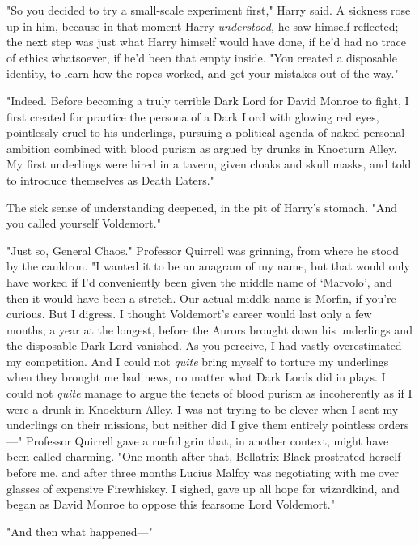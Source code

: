 "So you decided to try a small-scale experiment first," Harry said. A sickness
rose up in him, because in that moment Harry \emph{understood,} he saw himself
reflected; the next step was just what Harry himself would have done, if he'd
had no trace of ethics whatsoever, if he'd been that empty inside. "You created
a disposable identity, to learn how the ropes worked, and get your mistakes out
of the way."

"Indeed. Before becoming a truly terrible Dark Lord for David Monroe to fight,
I first created for practice the persona of a Dark Lord with glowing red eyes,
pointlessly cruel to his underlings, pursuing a political agenda of naked
personal ambition combined with blood purism as argued by drunks in Knocturn
Alley. My first underlings were hired in a tavern, given cloaks and skull
masks, and told to introduce themselves as Death Eaters."

The sick sense of understanding deepened, in the pit of Harry's stomach. "And
you called yourself Voldemort."

"Just so, General Chaos." Professor Quirrell was grinning, from where he stood
by the cauldron. "I wanted it to be an anagram of my name, but that would only
have worked if I'd conveniently been given the middle name of `Marvolo', and
then it would have been a stretch. Our actual middle name is Morfin, if you're
curious. But I digress. I thought Voldemort's career would last only a few
months, a year at the longest, before the Aurors brought down his underlings
and the disposable Dark Lord vanished. As you perceive, I had vastly
overestimated my competition. And I could not \emph{quite} bring myself to
torture my underlings when they brought me bad news, no matter what Dark Lords
did in plays. I could not \emph{quite} manage to argue the tenets of blood
purism as incoherently as if I were a drunk in Knockturn Alley. I was not
trying to be clever when I sent my underlings on their missions, but neither
did I give them entirely pointless orders---" Professor Quirrell gave a rueful
grin that, in another context, might have been called charming. "One month
after that, Bellatrix Black prostrated herself before me, and after three
months Lucius Malfoy was negotiating with me over glasses of expensive
Firewhiskey. I sighed, gave up all hope for wizardkind, and began as David
Monroe to oppose this fearsome Lord Voldemort."

"And then what happened---"

